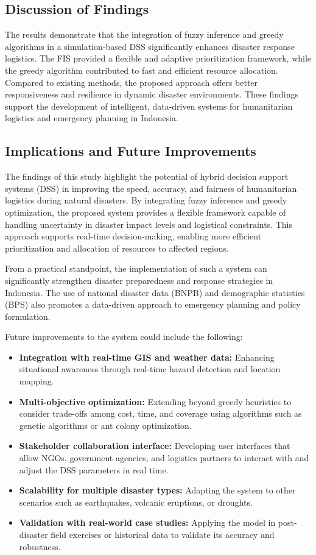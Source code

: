 \documentclass[journal,final,a4paper,twoside,11pt]{IEEEtran}
\begin{document}
\subsection{Discussion of Findings}
The results demonstrate that the integration of fuzzy inference and greedy algorithms in a simulation-based DSS significantly enhances disaster response logistics. The FIS provided a flexible and adaptive prioritization framework, while the greedy algorithm contributed to fast and efficient resource allocation. Compared to existing methods, the proposed approach offers better responsiveness and resilience in dynamic disaster environments. These findings support the development of intelligent, data-driven systems for humanitarian logistics and emergency planning in Indonesia.

\subsection{Implications and Future Improvements}

The findings of this study highlight the potential of hybrid decision support systems (DSS) in improving the speed, accuracy, and fairness of humanitarian logistics during natural disasters. By integrating fuzzy inference and greedy optimization, the proposed system provides a flexible framework capable of handling uncertainty in disaster impact levels and logistical constraints. This approach supports real-time decision-making, enabling more efficient prioritization and allocation of resources to affected regions.

From a practical standpoint, the implementation of such a system can significantly strengthen disaster preparedness and response strategies in Indonesia. The use of national disaster data (BNPB) and demographic statistics (BPS) also promotes a data-driven approach to emergency planning and policy formulation.

Future improvements to the system could include the following:

\begin{itemize}
    \item \textbf{Integration with real-time GIS and weather data:} Enhancing situational awareness through real-time hazard detection and location mapping.
    \item \textbf{Multi-objective optimization:} Extending beyond greedy heuristics to consider trade-offs among cost, time, and coverage using algorithms such as genetic algorithms or ant colony optimization.
    \item \textbf{Stakeholder collaboration interface:} Developing user interfaces that allow NGOs, government agencies, and logistics partners to interact with and adjust the DSS parameters in real time.
    \item \textbf{Scalability for multiple disaster types:} Adapting the system to other scenarios such as earthquakes, volcanic eruptions, or droughts.
    \item \textbf{Validation with real-world case studies:} Applying the model in post-disaster field exercises or historical data to validate its accuracy and robustness.
\end{itemize}
\end{document}

